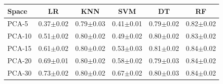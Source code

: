 \begin{tabular}{lccccc}
\toprule
Space & LR & KNN & SVM & DT & RF \\
\midrule
PCA-5 & 0.37$\pm$0.02 & 0.79$\pm$0.03 & 0.41$\pm$0.01 & 0.79$\pm$0.02 & 0.82$\pm$0.02 \\
PCA-10 & 0.51$\pm$0.02 & 0.80$\pm$0.02 & 0.49$\pm$0.02 & 0.80$\pm$0.02 & 0.83$\pm$0.02 \\
PCA-15 & 0.61$\pm$0.02 & 0.80$\pm$0.02 & 0.53$\pm$0.03 & 0.81$\pm$0.02 & 0.84$\pm$0.02 \\
PCA-20 & 0.69$\pm$0.01 & 0.80$\pm$0.02 & 0.58$\pm$0.02 & 0.79$\pm$0.03 & 0.84$\pm$0.02 \\
PCA-30 & 0.73$\pm$0.02 & 0.80$\pm$0.02 & 0.67$\pm$0.02 & 0.80$\pm$0.03 & 0.84$\pm$0.02 \\
\bottomrule
\end{tabular}
